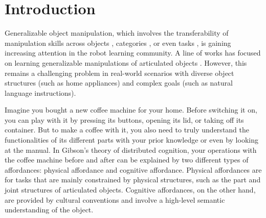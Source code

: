 \section{Introduction}



Generalizable object manipulation, which involves the transferability of manipulation skills across objects \todo{[cite]}, categories \todo{[cite]}, or even tasks \todo{[cite]}, is gaining increasing attention in the robot learning community.
A line of works has focused on learning generalizable manipulations of articulated objects \todo{[cite]}. However, this remains a challenging problem in real-world scenarios with diverse object structures (such as home appliances) and complex goals (such as natural language instructions).

Imagine you bought a new coffee machine for your home. Before switching it on, you can play with it by pressing its buttons, opening its lid, or taking off its container. But to make a coffee with it, you also need to truly understand the functionalities of its different parts with your prior knowledge or even by looking at the manual.
%
In Gibson's theory of distributed cognition, your operations with the coffee machine before and after can be explained by two different types of affordances: physical affordance and cognitive affordance. Physical affordances are for tasks that are mainly constrained by physical structures, such as the part and joint structures of articulated objects. Cognitive affordances, on the other hand, are provided by cultural conventions and involve a high-level semantic understanding of the object.

